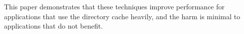 This paper demonstrates that these techniques improve performance for applications that use the directory cache heavily,
and the harm is minimal to applications that do not benefit.





